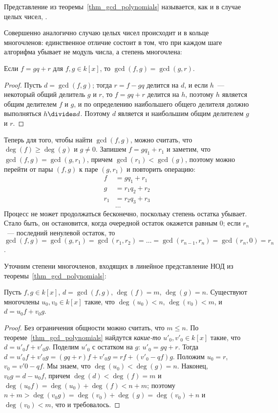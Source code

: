 \begin{remark}
Представление из теоремы~\ref{thm_gcd_polynomials} называется, как и в
случае целых чисел, .
\end{remark}

Совершенно аналогично случаю целых чисел происходит и  в кольце многочленов: единственное
отличие состоит в том,
что при каждом шаге алгорифма убывает не модуль числа, а степень
многочлена:

\begin{lemma}
Если $f=gq+r$ для $f,g\in k[x]$, то $\gcd(f,g)=\gcd(g,r)$.
\end{lemma}
\begin{proof}
Пусть $d=\gcd(f,g)$; тогда $r=f-gq$ делится на $d$, и если $h$~---
некоторый общий делитель $g$ и $r$, то $f=gq+r$ делится на $h$,
поэтому $h$ является общим делителем $f$ и $g$, и по определению
наибольшего общего делителя должно выполняться $h\divides d$. Поэтому
$d$ является и наибольшим общим делителем $g$ и $r$.
\end{proof}

Теперь для того, чтобы найти $\gcd(f,g)$, можно считать, что
$\deg(f)\geq\deg(g)$ и $g\neq 0$.
Запишем $f=gq_1+r_1$ и заметим, что
$\gcd(f,g)=\gcd(g,r_1)$, причем $\gcd(r_1)<\gcd(g)$, поэтому можно
перейти от пары $(f,g)$ к паре $(g,r_1)$ и повторить операцию:
\begin{align*}
f&=gq_1+r_1\\
g&=r_1q_2+r_2\\
r_1&=r_2q_3+r_3\\
&\dots
\end{align*}
Процесс не может продолжаться бесконечно, поскольку степень остатка
убывает. Стало быть, он остановится, когда очередной остаток окажется
равным $0$; если $r_n$~--- последний ненулевой остаток, то
$\gcd(f,g)=\gcd(g,r_1)=\gcd(r_1,r_2)=\dots=\gcd(r_{n-1},r_n)=\gcd(r_n,0)=r_n$.

Уточним степени
многочленов, входящих в линейное представление НОД из
теоремы~\ref{thm_gcd_polynomials}:
\begin{proposition}
Пусть $f,g\in k[x]$, $d=\gcd(f,g)$, $\deg(f)=m$,
$\deg(g)=n$. Существуют многочлены $u_0,v_0\in k[x]$ такие, что
$\deg(u_0)<n$, $\deg(v_0)<m$, и $d=u_0f+v_0g$.
\end{proposition}
\begin{proof}
Без ограничения общности можно считать, что $m\leq n$.
По теореме~\ref{thm_gcd_polynomials} найдутся {\it какие-то}
$u'_0,v'_0\in k[x]$ такие, что $d=u'_0f+v'_0g$. Поделим $u'_0$ с
остатком на $g$: $u'_0=gq+r$. Тогда $d=u'_0f+v'_0g=(gq+r)f+v'_0g=
rf+(v'_0-qf)g$. Положим $u_0=r$, $v_0=v'0-qf$. Мы знаем, что
$\deg(u_0)<\deg(g)=n$. Наконец, $v_0g=d-u_0f$, причем
$\deg(d)<\deg(f)=m$ и
$\deg(u_0f)=\deg(u_0)+\deg(f)< n+m$; поэтому
$n+m>\deg(v_0g)=\deg(v_0)+\deg(g)=\deg(v_0)+n$ и $\deg(v_0)<m$, что и
требовалось.
\end{proof}

